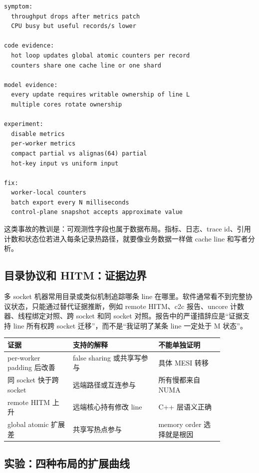 \begin{lstlisting}[numbers=none,caption={共享写事故复盘字段}]
symptom:
  throughput drops after metrics patch
  CPU busy but useful records/s lower

code evidence:
  hot loop updates global atomic counters per record
  counters share one cache line or one shard

model evidence:
  every update requires writable ownership of line L
  multiple cores rotate ownership

experiment:
  disable metrics
  per-worker metrics
  compact partial vs alignas(64) partial
  hot-key input vs uniform input

fix:
  worker-local counters
  batch export every N milliseconds
  control-plane snapshot accepts approximate value
\end{lstlisting}

这类事故的教训是：可观测性字段也属于数据布局。指标、日志、trace id、引用计数和状态位若进入每条记录热路径，就要像业务数据一样做 cache line 和写者分析。

\subsection{目录协议和 HITM：证据边界}

多 socket 机器常用目录或类似机制追踪哪条 line 在哪里。软件通常看不到完整协议状态，只能通过替代证据推断，例如 remote HITM、c2c 报告、uncore 计数器、线程绑定对照、跨 socket 和同 socket 对照。报告中的严谨措辞应是“证据支持 line 所有权跨 socket 迁移”，而不是“我证明了某条 line 一定处于 M 状态”。

\begin{center}
\begin{tabular}{p{0.26\linewidth}p{0.34\linewidth}p{0.26\linewidth}}
\toprule
证据 & 支持的解释 & 不能单独证明 \\
\midrule
per-worker padding 后改善 & false sharing 或共享写参与 & 具体 MESI 转移 \\
同 socket 快于跨 socket & 远端路径或互连参与 & 所有慢都来自 NUMA \\
remote HITM 上升 & 远端核心持有修改 line & C++ 层语义正确 \\
global atomic 扩展差 & 共享写热点参与 & memory order 选择就是根因 \\
\bottomrule
\end{tabular}
\end{center}

\subsection{实验：四种布局的扩展曲线}

